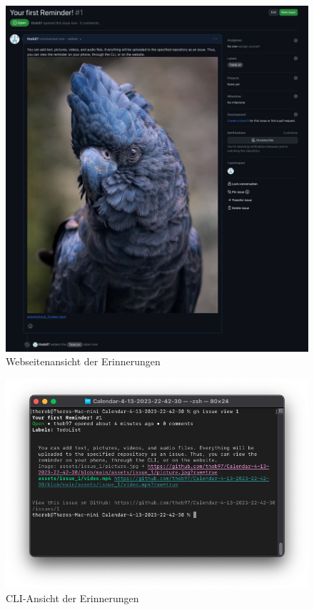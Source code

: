 \begin{figure}
    \centering
    \includegraphics[width=1.1\textwidth]{res/reminders_webview.png} 
    \caption{Webseitenansicht der Erinnerungen} 
    \label{pic_webview}
\end{figure}

\begin{figure}
    \centering
    \includegraphics[width=1\textwidth]{res/reminder_cli.png} 
    \caption{CLI-Ansicht der Erinnerungen} 
    \label{pic_reminder_cli}
\end{figure}
